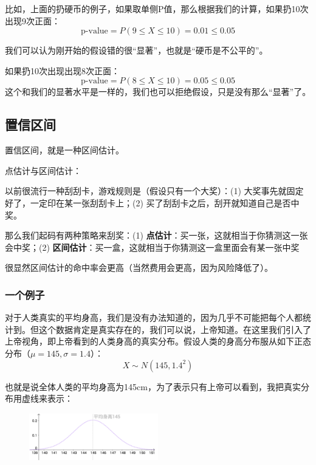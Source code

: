 \documentclass[12pt]{article}
\begin{document}
比如，上面的扔硬币的例子，如果取单侧P值，那么根据我们的计算，如果扔10次出现9次正面：
$$
\text{p-value} = P(9 \le X \le 10) = 0.01 \le 0.05
$$

我们可以认为刚开始的假设错的很“显著”，也就是“硬币是不公平的”。

如果扔10次出现出现8次正面：
$$
\text{p-value} = P(8 \le X \le 10) = 0.05 \le 0.05
$$
这个和我们的显著水平是一样的，我们也可以拒绝假设，只是没有那么“显著”了。

\subsection{置信区间}
置信区间，就是一种区间估计。

\begin{framed}
点估计与区间估计：

以前很流行一种刮刮卡，游戏规则是（假设只有一个大奖）：(1) 大奖事先就固定好了，一定印在某一张刮刮卡上；(2) 买了刮刮卡之后，刮开就知道自己是否中奖。

那么我们起码有两种策略来刮奖：(1) \textbf{点估计}：买一张，这就相当于你猜测这一张会中奖；(2) \textbf{区间估计}：买一盒，这就相当于你猜测这一盒里面会有某一张中奖

很显然区间估计的命中率会更高（当然费用会更高，因为风险降低了）。
\end{framed}

\subsubsection{一个例子}
对于人类真实的平均身高，我们是没有办法知道的，因为几乎不可能把每个人都统计到。但这个数据肯定是真实存在的，我们可以说，上帝知道。在这里我们引入了上帝视角，即上帝看到的人类身高的真实分布。假设人类的身高分布服从如下正态分布（$\mu = 145, \sigma = 1.4$）：
$$
X \sim N(145, 1.4^2)
$$

也就是说全体人类的平均身高为145cm，为了表示只有上帝可以看到，我把真实分布用虚线来表示：
\begin{figure}[H]
    \centering
    \includegraphics[width=0.5\textwidth]{fig/Confidence_Interval_Example_1.png}
\end{figure}
\end{document}
